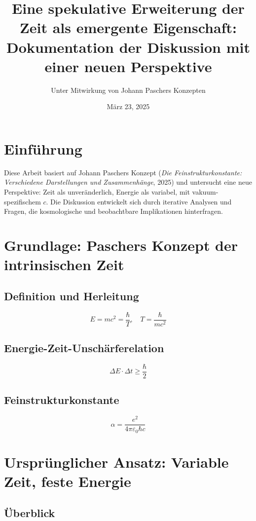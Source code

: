 \documentclass{article}
\title{Eine spekulative Erweiterung der Zeit als emergente Eigenschaft: \\Dokumentation der Diskussion mit einer neuen Perspektive}
\author{Unter Mitwirkung von Johann Paschers Konzepten}
\date{März 23, 2025}
\begin{document}
	
	\maketitle
	
	\section{Einführung}
	
	Diese Arbeit basiert auf Johann Paschers Konzept (\textit{Die Feinstrukturkonstante: Verschiedene Darstellungen und Zusammenhänge}, 2025) und untersucht eine neue Perspektive: Zeit als unveränderlich, Energie als variabel, mit vakuum-spezifischem \( c \). Die Diskussion entwickelt sich durch iterative Analysen und Fragen, die kosmologische und beobachtbare Implikationen hinterfragen.
	
	\section{Grundlage: Paschers Konzept der intrinsischen Zeit}
	
	\subsection{Definition und Herleitung}
	
	\[
	E = mc^2 = \frac{\hbar}{T}, \quad T = \frac{\hbar}{mc^2}
	\]
	
	\subsection{Energie-Zeit-Unschärferelation}
	
	\[
	\Delta E \cdot \Delta t \geq \frac{\hbar}{2}
	\]
	
	\subsection{Feinstrukturkonstante}
	
	\[
	\alpha = \frac{e^2}{4\pi \varepsilon_0 \hbar c}
	\]
	
	\section{Ursprünglicher Ansatz: Variable Zeit, feste Energie}
	
	\subsection{Überblick}
	
\end{document}

